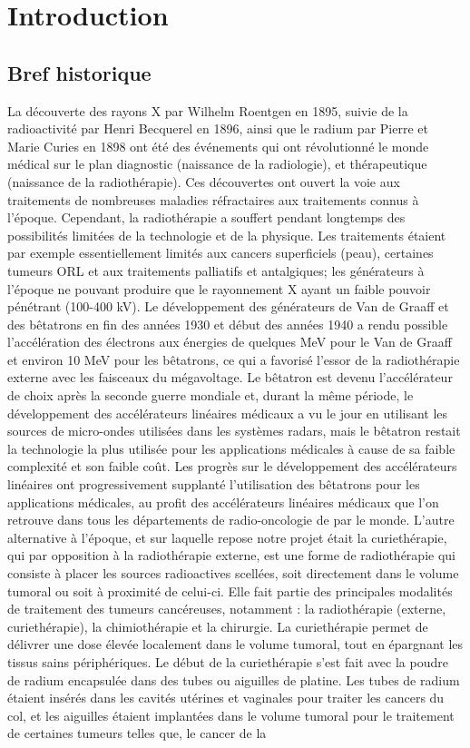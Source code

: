 \chapter{Introduction}     %
\section{Bref historique}
%
\lettrine[nindent=0em,lines=2]{L}{}a découverte des rayons X par Wilhelm Roentgen en 1895, suivie de la radioactivité par Henri Becquerel en 1896, ainsi que le radium par Pierre et Marie Curies en 1898 ont été des événements qui ont révolutionné le monde médical sur le plan diagnostic (naissance de la radiologie), et thérapeutique (naissance de la radiothérapie). Ces découvertes ont ouvert la voie aux traitements de nombreuses maladies réfractaires aux traitements connus à l’époque.  Cependant, la radiothérapie a souffert pendant longtemps des possibilités limitées de la technologie et de la physique. Les traitements étaient par exemple essentiellement limités aux cancers superficiels (peau), certaines tumeurs ORL  et aux traitements palliatifs et antalgiques; les générateurs à l’époque ne pouvant produire que le rayonnement X ayant un faible pouvoir pénétrant (100-400 kV). Le développement des générateurs de Van de Graaff et des bêtatrons en fin des années 1930 et début des années 1940 a rendu possible l’accélération des électrons aux énergies de quelques MeV pour le Van de Graaff et environ 10 MeV pour les bêtatrons, ce qui a favorisé l’essor de la radiothérapie externe avec les faisceaux du mégavoltage. Le bêtatron est devenu l’accélérateur de choix après la seconde guerre mondiale et, durant la même période, le développement des accélérateurs linéaires médicaux a vu le jour en utilisant les sources de micro-ondes utilisées dans les systèmes radars, mais le bêtatron restait la technologie la plus utilisée pour les applications médicales à cause de sa faible complexité et son faible coût. Les progrès sur le développement des accélérateurs linéaires ont progressivement supplanté l’utilisation des bêtatrons pour les applications médicales, au profit des accélérateurs linéaires médicaux que l’on retrouve dans tous les départements de radio-oncologie de par le monde. L’autre alternative à l'époque, et sur laquelle repose notre projet était la curiethérapie, qui par opposition à la radiothérapie externe, est une forme de radiothérapie qui consiste à placer les sources radioactives scellées, soit directement dans le volume tumoral ou soit à proximité de celui-ci. Elle fait partie des principales modalités de traitement des tumeurs cancéreuses, notamment : la radiothérapie (externe, curiethérapie), la chimiothérapie et la chirurgie. La curiethérapie permet de délivrer une dose élevée localement dans le volume tumoral, tout en épargnant les tissus sains périphériques. Le début de la curiethérapie s’est fait avec la poudre de radium encapsulée dans des tubes ou aiguilles de platine. Les tubes de radium étaient insérés dans les cavités utérines et vaginales pour traiter les cancers du col, et les aiguilles étaient implantées dans le volume tumoral pour le traitement de certaines tumeurs telles que, le cancer de la 